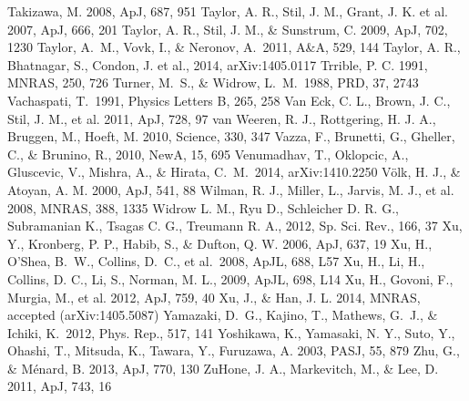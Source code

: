 \begin{thebibliography}{99}
\begin{multicols}{2}
{
	Takizawa, M. 2008, ApJ, 687, 951
	Taylor, A. R., Stil, J. M., Grant, J. K. et al. 2007, ApJ, 666, 201
	Taylor, A. R., Stil, J. M., \& Sunstrum, C. 2009, ApJ, 702, 1230
	Taylor, A.~M., Vovk, I., \& Neronov, A.\ 2011, A\&A, 529, 144
	Taylor, A. R., Bhatnagar, S., Condon, J. et al., 2014, arXiv:1405.0117
	Trrible, P. C. 1991, MNRAS, 250, 726
	Turner, M.~S., \& Widrow, L.~M.\ 1988, PRD, 37, 2743
	Vachaspati, T.\ 1991, Physics Letters B, 265, 258
	Van Eck, C. L., Brown, J. C., Stil, J. M., et al. 2011, ApJ, 728, 97
	van Weeren, R. J., R\:ottgering, H. J. A., Br\:uggen, M., Hoeft, M. 2010, Science, 330, 347
	Vazza, F., Brunetti, G., Gheller, C., \& Brunino, R., 2010, NewA, 15, 695
	Venumadhav, T., Oklopcic, A., Gluscevic, V., Mishra, A., \& Hirata, C.~M.\ 2014, arXiv:1410.2250 
	V\"{o}lk, H. J., \& Atoyan, A. M. 2000, ApJ, 541, 88
	Wilman, R. J., Miller, L., Jarvis, M. J., et al. 2008, MNRAS, 388, 1335
	Widrow L. M., Ryu D., Schleicher D. R. G., Subramanian K., Tsagas C. G., Treumann R. A., 2012, Sp. Sci. Rev., 166, 37
	Xu, Y., Kronberg, P. P., Habib, S., \& Dufton, Q. W. 2006, ApJ, 637, 19
	Xu, H., O'Shea, B.~W., Collins, D.~C., et al.\ 2008, ApJL, 688, L57 
	Xu, H., Li, H., Collins, D. C., Li, S., Norman, M. L., 2009, ApJL, 698, L14
	Xu, H., Govoni, F., Murgia, M., et al. 2012, ApJ, 759, 40
	Xu, J., \& Han, J. L. 2014, MNRAS, accepted (arXiv:1405.5087)
	Yamazaki, D.~G., Kajino, T., Mathews, G.~J., \& Ichiki, K.\ 2012, Phys. Rep., 517, 141
	Yoshikawa, K., Yamasaki, N. Y., Suto, Y., Ohashi, T., Mitsuda, K., Tawara, Y., Furuzawa, A. 2003, PASJ, 55, 879
	Zhu, G., \& M\'enard, B. 2013, ApJ, 770, 130
	ZuHone, J. A., Markevitch, M., \& Lee, D. 2011, ApJ, 743, 16
}\end{multicols}
\end{thebibliography}

